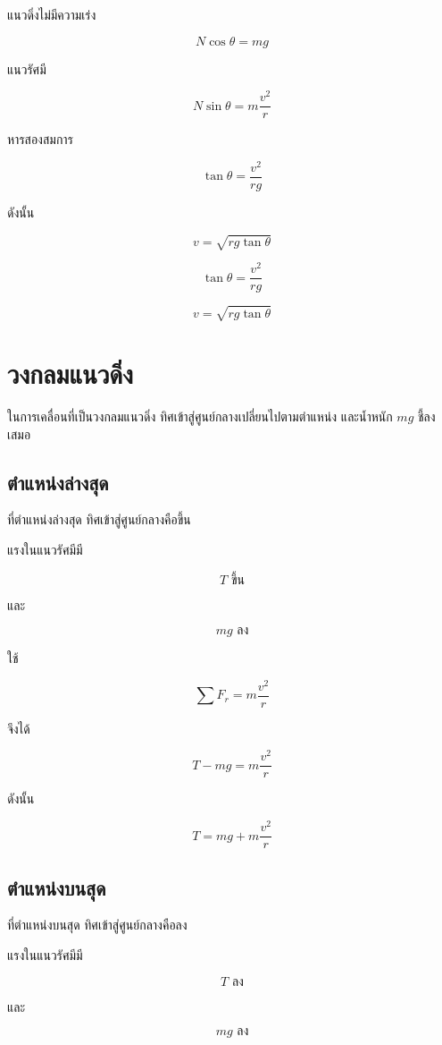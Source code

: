 แนวดิ่งไม่มีความเร่ง

\[
N\cos\theta=mg
\]

แนวรัศมี

\[
N\sin\theta=m\frac{v^2}{r}
\]

หารสองสมการ

\[
\tan\theta=\frac{v^2}{rg}
\]

ดังนั้น

\[
v=\sqrt{rg\tan\theta}
\]

\begin{tcolorbox}[title=ทางโค้งเอียงไร้แรงเสียดทาน]
\[
\tan\theta=\frac{v^2}{rg}
\]

\[
v=\sqrt{rg\tan\theta}
\]
\end{tcolorbox}

\section{วงกลมแนวดิ่ง}

ในการเคลื่อนที่เป็นวงกลมแนวดิ่ง ทิศเข้าสู่ศูนย์กลางเปลี่ยนไปตามตำแหน่ง และน้ำหนัก $mg$ ชี้ลงเสมอ

\subsection{ตำแหน่งล่างสุด}

ที่ตำแหน่งล่างสุด ทิศเข้าสู่ศูนย์กลางคือขึ้น

แรงในแนวรัศมีมี

\[
T \text{ ขึ้น}
\]

และ

\[
mg \text{ ลง}
\]

ใช้

\[
\sum F_r=m\frac{v^2}{r}
\]

จึงได้

\[
T-mg=m\frac{v^2}{r}
\]

ดังนั้น

\[
T=mg+m\frac{v^2}{r}
\]

\subsection{ตำแหน่งบนสุด}

ที่ตำแหน่งบนสุด ทิศเข้าสู่ศูนย์กลางคือลง

แรงในแนวรัศมีมี

\[
T \text{ ลง}
\]

และ

\[
mg \text{ ลง}
\]

